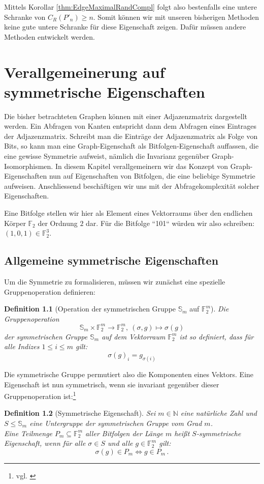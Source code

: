 \documentclass[10pt,a4paper, footheight=1mm, bibliography=totoc]{scrreprt}
\newtheorem{definition}{Definition}
\theoremstyle{definition}
\begin{document}
Mittels Korollar \ref{thm:EdgeMaximalRandCompl} folgt also bestenfalls
eine untere Schranke von $C_R(P'_n) \geq n$. Somit können
wir mit unseren bisherigen Methoden keine gute untere Schranke
für diese Eigenschaft zeigen. Dafür müssen andere Methoden
entwickelt werden.

\chapter{Verallgemeinerung auf symmetrische Eigenschaften}
Die bisher betrachteten Graphen können mit einer Adjazenzmatrix
dargestellt werden. 
Ein Abfragen von Kanten entspricht dann
dem Abfragen eines Eintrages der Adjazenzmatrix.
Schreibt man die Einträge der Adjazenzmatrix als Folge von
Bits, so kann man eine Graph-Eigenschaft als Bitfolgen-Eigenschaft
auffassen, die eine gewisse Symmetrie aufweist, nämlich
die Invarianz gegenüber Graph-Isomorphismen.
In diesem Kapitel verallgemeinern wir das Konzept von
Graph-Eigenschaften nun auf Eigenschaften von Bitfolgen,
die eine beliebige Symmetrie aufweisen.
Anschliessend beschäftigen wir uns mit der Abfragekomplexität
solcher Eigenschaften.

Eine Bitfolge stellen wir hier als Element eines Vektorraums
über den endlichen Körper $\mathbb{F}_2$ der Ordnung $2$ dar.
Für die Bitfolge ``101`` würden wir also schreiben:
$ (1,0,1) \in \mathbb{F}_2^3$.

\section{Allgemeine symmetrische Eigenschaften}
Um die Symmetrie zu formalisieren, müssen wir zunächst
eine spezielle Gruppenoperation definieren:

\begin{definition}
[Operation der symmetrischen Gruppe $\mathbb{S}_m$ auf $\mathbb{F}_2^m$]
Die Gruppenoperation
$$\mathbb{S}_m \times \mathbb{F}_2^m \to \mathbb{F}_2^m, 
  \ (\sigma,g) \mapsto \sigma(g)$$
der symmetrischen Gruppe $\mathbb{S}_m$ auf dem
Vektorraum $\mathbb{F}_2^m$ ist so definiert,
dass für alle Indizes $1\leq i \leq m$ gilt:
$$ \sigma(g)_i = g_{\sigma(i)} $$
\end{definition}
Die symmetrische Gruppe permutiert also die Komponenten eines
Vektors. Eine Eigenschaft ist nun symmetrisch, wenn sie invariant
gegenüber dieser Gruppenoperation ist:\footnote{vgl. \cite[S.7]{Rivest}}

\begin{definition}[Symmetrische Eigenschaft]
Sei $m\in \mathbb{N}$ eine natürliche Zahl und
$S \leq \mathbb{S}_m$ eine Untergruppe der 
symmetrischen Gruppe vom Grad $m$. \\
Eine Teilmenge
$P_m \subseteq \mathbb{F}_2^m$ aller Bitfolgen der
Länge $m$ heißt \emph{$S$-symmetrische Eigenschaft}, wenn
für alle $\sigma \in S$ und alle $g\in \mathbb{F}_2^m$ gilt:
$$ \sigma(g)\in P_m \iff g \in P_m\,.$$ 
\end{definition}
\end{document}
